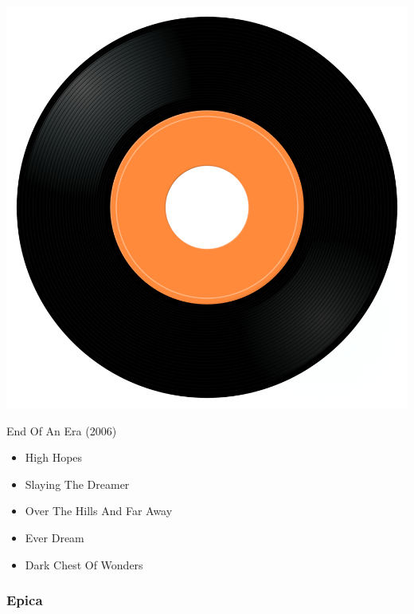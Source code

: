 \begin{minipage}[t]{0.25\textwidth}
\captionsetup{type=figure}
\includegraphics[width=\textwidth]{Images/cover.png}
\caption*{End Of An Era (2006)}
\end{minipage}
\begin{minipage}[t]{0.25\textwidth}\vspace{0pt}
\begin{itemize}[nosep,leftmargin=1em,labelwidth=*,align=left]
	\setlength{\itemsep}{0pt}
	\item High Hopes
	\item Slaying The Dreamer
	\item Over The Hills And Far Away
	\item Ever Dream 
	\item Dark Chest Of Wonders
\end{itemize}
\end{minipage}

\subsubsection{Epica}

